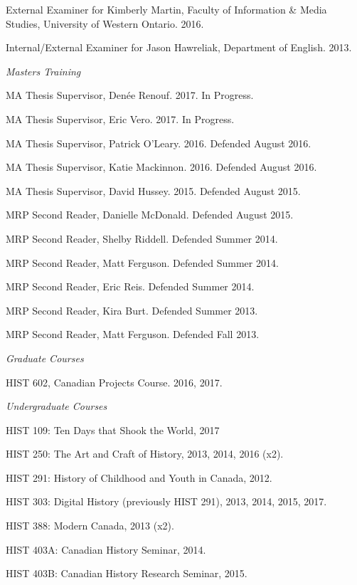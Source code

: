 \documentclass[11pt,article,oneside]{memoir}
\begin{document}
\ind External Examiner for Kimberly Martin, Faculty of Information \& Media Studies, University of Western Ontario. 2016.

\ind Internal/External Examiner for Jason Hawreliak, Department of English. 2013.

\medskip
\noindent\emph{Masters Training \vspace{0.01in}}

\ind MA Thesis Supervisor, Den\'ee Renouf. 2017. In Progress.

\ind MA Thesis Supervisor, Eric Vero. 2017. In Progress.

\ind MA Thesis Supervisor, Patrick O'Leary. 2016. Defended August 2016.

\ind MA Thesis Supervisor, Katie Mackinnon. 2016. Defended August 2016.

\ind MA Thesis Supervisor, David Hussey. 2015. Defended August 2015.

\ind MRP Second Reader, Danielle McDonald. Defended August 2015.

\ind MRP Second Reader, Shelby Riddell. Defended Summer 2014.

\ind MRP Second Reader, Matt Ferguson. Defended Summer 2014.

\ind MRP Second Reader, Eric Reis. Defended Summer 2014.

\ind MRP Second Reader, Kira Burt. Defended Summer 2013.

\ind MRP Second Reader, Matt Ferguson. Defended Fall 2013.

\medskip
\noindent\emph{Graduate Courses \vspace{0.05in}}

\ind HIST 602, Canadian Projects Course. 2016, 2017.

\medskip

\noindent\emph{Undergraduate Courses \vspace{0.05in}}

\ind HIST 109: Ten Days that Shook the World, 2017

\ind HIST 250: The Art and Craft of History, 2013, 2014, 2016 (x2).

\ind HIST 291: History of Childhood and Youth in Canada, 2012.

\ind HIST 303: Digital History (previously HIST 291), 2013, 2014, 2015, 2017.

\ind HIST 388: Modern Canada, 2013 (x2).

\ind HIST 403A: Canadian History Seminar, 2014.

\ind HIST 403B: Canadian History Research Seminar, 2015.
\end{document}
